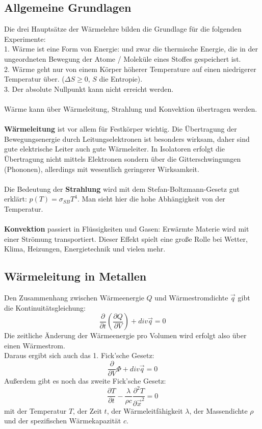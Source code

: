\documentclass[12pt,a4paper,twopage]{article}
\begin{document}
\subsection{Allgemeine Grundlagen}
Die drei Hauptsätze der Wärmelehre bilden die Grundlage für die folgenden Experimente:\\
1. Wärme ist eine Form von Energie: und zwar die thermische Energie, die in der ungeordneten Bewegung der Atome / Moleküle eines Stoffes gespeichert ist.\\
2. Wärme geht nur von einem Körper höherer Temperature auf einen niedrigerer Temperatur über. ($\Delta S \geq 0$, $S$ die Entropie).\\
3. Der absolute Nullpunkt kann nicht erreicht werden.\\
\\
Wärme kann über Wärmeleitung, Strahlung und Konvektion übertragen werden.\\
\\
\textbf{Wärmeleitung} ist vor allem für Festkörper wichtig. Die Übertragung der Bewegungsenergie durch Leitungselektronen ist besonders wirksam, daher sind gute elektrische Leiter auch gute Wärmeleiter. In Isolatoren erfolgt die Übertragung nicht mittels Elektronen sondern über die Gitterschwingungen (Phononen), allerdings mit wesentlich geringerer Wirksamkeit.\\
\\
Die Bedeutung der \textbf{Strahlung} wird mit dem Stefan-Boltzmann-Gesetz gut erklärt: $p(T)=\sigma_{SB} T^4$. Man sieht hier die hohe Abhängigkeit von der Temperatur.\\
\\
\textbf{Konvektion} passiert in Flüssigkeiten und Gasen: Erwärmte Materie wird mit einer Strömung transportiert. Dieser Effekt spielt eine große Rolle bei Wetter, Klima, Heizungen, Energietechnik und vielen mehr. 

\subsection{Wärmeleitung in Metallen}
Den Zusammenhang zwischen Wärmeenergie $Q$ und Wärmestromdichte $\vec{q}$ gibt die Kontinuitätsgleichung:
$$\frac{\partial}{\partial t}\left(\frac{\partial Q}{\partial V}\right) + div \vec{q}=0$$
Die zeitliche Änderung der Wärmeenergie pro Volumen wird erfolgt also über einen Wärmestrom.\\
Daraus ergibt sich auch das 1. Fick'sche Gesetz:
$$\frac{\partial}{\partial V}\Phi + div \vec{q}=0$$
Außerdem gibt es noch das zweite Fick'sche Gesetz:
$$\frac{\partial T}{\partial t}-\frac{\lambda}{\rho c	}\frac{\partial^2 T}{\partial \vec{x}^2}=0$$
mit der Temperatur $T$, der Zeit $t$, der Wärmeleitfähigkeit $\lambda$, der Massendichte $\rho$ und der spezifischen Wärmekapazität $c$.
\end{document}
